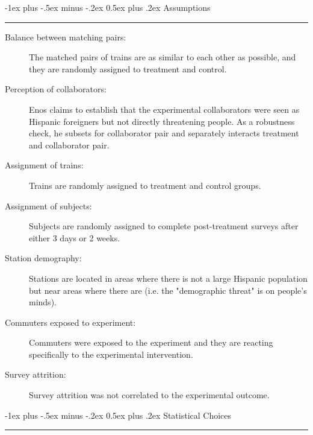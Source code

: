 \documentclass[10pt,landscape]{article}
\makeatletter
\renewcommand{\section}{\@startsection{section}{1}{0mm}%
                                {-1ex plus -.5ex minus -.2ex}%
                                {0.5ex plus .2ex}%
                                {\normalfont\Large\bfseries}}
\makeatother
\begin{document}
\begin{multicols*}{2}
\begin{itemize}
   \end{itemize}

\section{Assumptions} \smallskip \hrule height 2pt \smallskip

   \small
   \begin{description}
         \item[Balance between matching pairs:] The matched pairs of trains are as similar to each other as possible, and they are randomly assigned to treatment and control.
         \item[Perception of collaborators:] Enos claims to establish that the experimental collaborators were seen as Hispanic foreigners but not directly threatening people. As a robustness check, he subsets for collaborator pair and separately interacts treatment and collaborator pair.
         \item[Assignment of trains:] Trains are randomly assigned to treatment and control groups.
         \item[Assignment of subjects:] Subjects are randomly assigned to complete post-treatment surveys after either 3 days or 2 weeks.
         \item[Station demography:] Stations are located in areas where there is not a large Hispanic population but near areas where there are (i.e. the "demographic threat" is on people's minds).
         \item[Commuters exposed to experiment:] Commuters were exposed to the experiment and they are reacting specifically to the experimental intervention.
         \item[Survey attrition:] Survey attrition was not correlated to the experimental outcome.
   \end{description}
      
\section{Statistical Choices}\smallskip \hrule height 2pt \smallskip

   \begin{center}
   

\end{center}
\end{multicols*}
\end{document}

